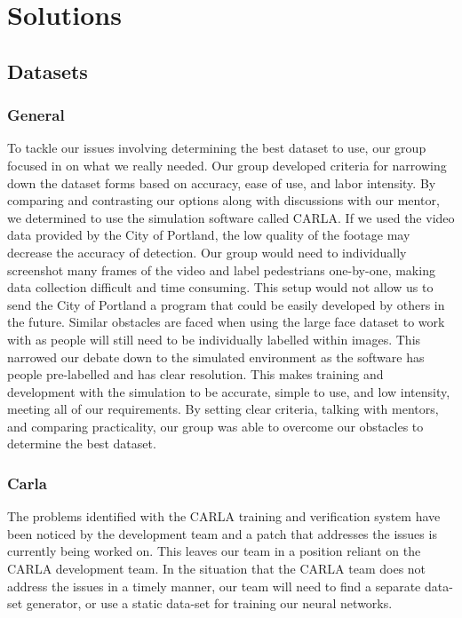 \documentclass[onecolumn, draftclsnofoot,10pt, compsoc]{IEEEtran}
\begin{document}
\section{Solutions}
\subsection{Datasets}
\subsubsection{General}
To tackle our issues involving determining the best dataset to use, our group focused in on what we really needed. Our group developed criteria for narrowing down the dataset forms based on accuracy, ease of use, and labor intensity. By comparing and contrasting our options along with discussions with our mentor, we determined to use the simulation software called CARLA. If we used the video data provided by the City of Portland, the low quality of the footage may decrease the accuracy of detection. Our group would need to individually screenshot many frames of the video and label pedestrians one-by-one, making data collection difficult and time consuming. This setup would not allow us to send the City of Portland a program that could be easily developed by others in the future. Similar obstacles are faced when using the large face dataset to work with as people will still need to be individually labelled within images. This narrowed our debate down to the simulated environment as the software has people pre-labelled and has clear resolution. This makes training and development with the simulation to be accurate, simple to use, and low intensity, meeting all of our requirements. By setting clear criteria, talking with mentors, and comparing practicality, our group was able to overcome our obstacles to determine the best dataset.

\subsubsection{Carla}
The problems identified with the CARLA training and verification system have been noticed by the development team and a patch that addresses the issues is currently being worked on. This leaves our team in a position reliant on the CARLA development team. In the situation that the CARLA team does not address the issues in a timely manner, our team will need to find a separate data-set generator, or use a static data-set for training our neural networks. 
\end{document}
